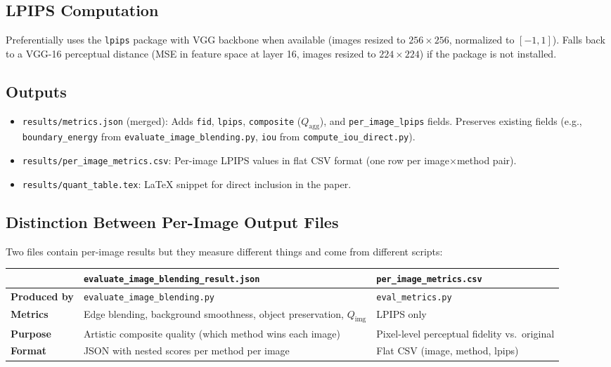 \documentclass[11pt,a4paper]{article}
\begin{document}
\subsection{LPIPS Computation}

Preferentially uses the \texttt{lpips} package with VGG backbone when available (images resized to $256 \times 256$, normalized to $[-1, 1]$). Falls back to a VGG-16 perceptual distance (MSE in feature space at layer 16, images resized to $224 \times 224$) if the package is not installed.

\subsection{Outputs}

\begin{itemize}
  \item \texttt{results/metrics.json} (merged): Adds \texttt{fid}, \texttt{lpips}, \texttt{composite} ($Q_{\text{agg}}$), and \texttt{per\_image\_lpips} fields. Preserves existing fields (e.g., \texttt{boundary\_energy} from \texttt{evaluate\_image\_blending.py}, \texttt{iou} from \texttt{compute\_iou\_direct.py}).
  \item \texttt{results/per\_image\_metrics.csv}: Per-image LPIPS values in flat CSV format (one row per image$\times$method pair).
  \item \texttt{results/quant\_table.tex}: \LaTeX{} snippet for direct inclusion in the paper.
\end{itemize}

\subsection{Distinction Between Per-Image Output Files}

Two files contain per-image results but they measure different things and come from different scripts:

\begin{table}[h]
\centering
\small
\begin{tabularx}{\textwidth}{lXX}
\toprule
 & \texttt{evaluate\_image\_blending\_result.json} & \texttt{per\_image\_metrics.csv} \\
\midrule
\textbf{Produced by} & \texttt{evaluate\_image\_blending.py} & \texttt{eval\_metrics.py} \\
\textbf{Metrics} & Edge blending, background smoothness, object preservation, $Q_{\text{img}}$ & LPIPS only \\
\textbf{Purpose} & Artistic composite quality (which method wins each image) & Pixel-level perceptual fidelity vs.\ original \\
\textbf{Format} & JSON with nested scores per method per image & Flat CSV (image, method, lpips) \\
\bottomrule
\end{tabularx}
\end{table}
\end{document}
